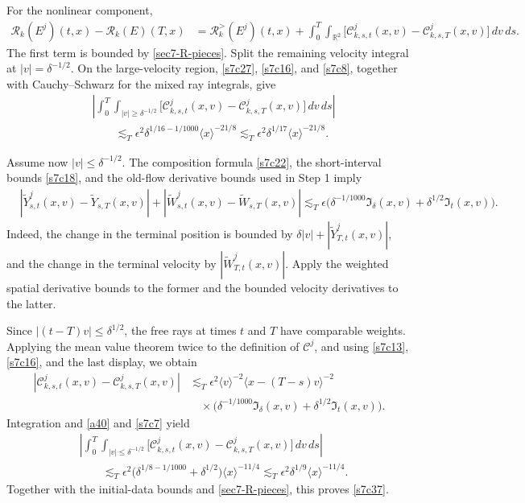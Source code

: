 \documentclass[reqno,11pt]{amsart}
\numberwithin{equation}{section}
\def\R{{\mathbb R}}
\def\R{{\bf R}}
\def\R{\mathbb{R}}
\begin{document}
For the nonlinear component,
\[
\begin{split}
\mathcal R_k(E^j)(t,x)-\mathcal R_k(E)(T,x)
&=\mathcal R_k^>(E^j)(t,x)+\int_0^T\int_{\R^2}
\big[\mathcal C^j_{k,s,t}(x,v)
-\mathcal C^j_{k,s,T}(x,v)\big]\,dv\,ds.
\end{split}
\]
The first term is bounded by \eqref{sec7-R-pieces}.
Split the remaining velocity integral at $|v|=\delta^{-1/2}$.
On the large-velocity region, \eqref{s7c27},
\eqref{s7c16}, and \eqref{s7c8}, together with
Cauchy--Schwarz for the mixed ray integrals, give
\[
\begin{split}
&\left|\int_0^T\int_{|v|\geq\delta^{-1/2}}
\big[\mathcal C^j_{k,s,t}(x,v)
-\mathcal C^j_{k,s,T}(x,v)\big]\,dv\,ds\right|\\
&\qquad\lesssim_T
\epsilon^2\delta^{1/16-1/1000}\langle x\rangle^{-21/8}
\lesssim_T\epsilon^2\delta^{1/17}\langle x\rangle^{-21/8}.
\end{split}
\]

Assume now $|v|\leq\delta^{-1/2}$.
The composition formula \eqref{s7c22}, the short-interval
bounds \eqref{s7c18}, and the old-flow derivative bounds
used in Step 1 imply
\[
\begin{split}
&|\widetilde Y^j_{s,t}(x,v)-\widetilde Y_{s,T}(x,v)|
+|\widetilde W^j_{s,t}(x,v)-\widetilde W_{s,T}(x,v)|\lesssim_T\epsilon
\big(\delta^{-1/1000}\mathfrak I_\delta(x,v)
+\delta^{1/2}\mathfrak I_t(x,v)\big).
\end{split}
\]
Indeed, the change in the terminal position is bounded by
$\delta|v|+|\widetilde Y^j_{T,t}(x,v)|$, and the change in
the terminal velocity by $|\widetilde W^j_{T,t}(x,v)|$.
Apply the weighted spatial derivative bounds to the former
and the bounded velocity derivatives to the latter.

Since $|(t-T)v|\leq\delta^{1/2}$, the free rays at times
$t$ and $T$ have comparable weights. Applying the mean
value theorem twice to the definition of $\mathcal C^j$,
and using \eqref{s7c13}, \eqref{s7c16}, and the last display,
we obtain
\[
\begin{split}
|\mathcal C^j_{k,s,t}(x,v)-\mathcal C^j_{k,s,T}(x,v)|
&\lesssim_T\epsilon^2
\langle v\rangle^{-2}\langle x-(T-s)v\rangle^{-2}\\
&\quad\times
\big(\delta^{-1/1000}\mathfrak I_\delta(x,v)
+\delta^{1/2}\mathfrak I_t(x,v)\big).
\end{split}
\]
Integration and \eqref{a40} and \eqref{s7c7} yield
\[
\begin{split}
&\left|\int_0^T\int_{|v|\leq\delta^{-1/2}}
\big[\mathcal C^j_{k,s,t}(x,v)
-\mathcal C^j_{k,s,T}(x,v)\big]\,dv\,ds\right|\\
&\qquad\lesssim_T\epsilon^2
\big(\delta^{1/8-1/1000}+\delta^{1/2}\big)
\langle x\rangle^{-11/4}
\lesssim_T\epsilon^2\delta^{1/9}\langle x\rangle^{-11/4}.
\end{split}
\]
Together with the initial-data bounds and \eqref{sec7-R-pieces},
this proves \eqref{s7c37}.
\end{document}
